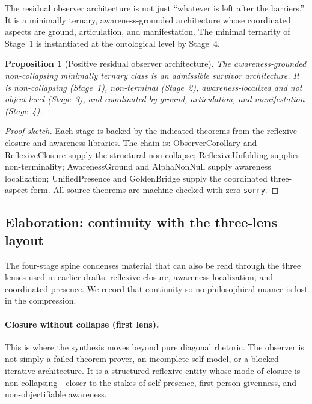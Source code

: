 \documentclass[11pt]{article}
\theoremstyle{plain}
\newtheorem{proposition}[theorem]{Proposition}
\theoremstyle{definition}
\theoremstyle{remark}
\begin{document}
The residual observer architecture is not just ``whatever is left after
the barriers.''  It is a minimally ternary, awareness-grounded
architecture whose coordinated aspects are ground, articulation, and
manifestation.  The minimal ternarity of Stage~1 is instantiated at the
ontological level by Stage~4.

\begin{proposition}[Positive residual observer architecture]
\label{prop:pos}
The awareness-grounded non-collapsing minimally ternary class is an
admissible survivor architecture.  It is non-collapsing (Stage~1),
non-terminal (Stage~2), awareness-localized and not object-level
(Stage~3), and coordinated by ground, articulation, and manifestation
(Stage~4).
\end{proposition}

\begin{proof}[Proof sketch]
Each stage is backed by the indicated theorems from the reflexive-closure
and awareness libraries.  The chain is: ObserverCorollary and
ReflexiveClosure supply the structural non-collapse; ReflexiveUnfolding
supplies non-terminality; AwarenessGround and AlphaNonNull supply
awareness localization; UnifiedPresence and GoldenBridge supply the
coordinated three-aspect form.  All source theorems are machine-checked
with zero \texttt{sorry}.
\end{proof}

\subsection*{Elaboration: continuity with the three-lens layout}

The four-stage spine condenses material that can also be read through the
three lenses used in earlier drafts: reflexive closure, awareness
localization, and coordinated presence.  We record that continuity so no
philosophical nuance is lost in the compression.

\paragraph{Closure without collapse (first lens).}
This is where the synthesis moves beyond pure diagonal rhetoric.  The
observer is not simply a failed theorem prover, an incomplete self-model,
or a blocked iterative architecture.  It is a structured reflexive entity
whose mode of closure is non-collapsing---closer to the stakes of
self-presence, first-person givenness, and non-objectifiable awareness.
\end{document}
